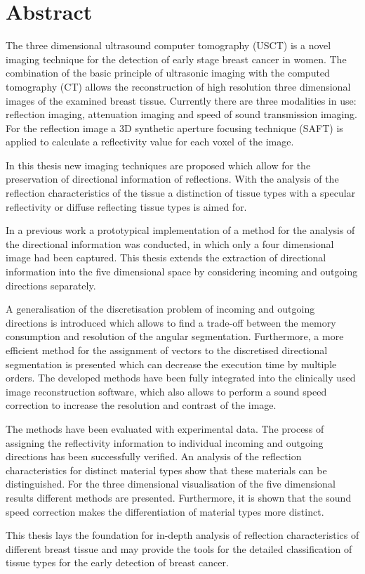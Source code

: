 \chapter*{Abstract}


The three dimensional ultrasound computer tomography (USCT) is a novel imaging technique for the detection of early stage breast cancer in women. The combination of the basic principle of ultrasonic imaging with the computed tomography (CT) allows the reconstruction of high resolution three dimensional images of the examined breast tissue. Currently there are three modalities in use: reflection imaging, attenuation imaging and speed of sound transmission imaging. For the reflection image a 3D synthetic aperture focusing technique (SAFT) is applied to calculate a reflectivity value for each voxel of the image.

In this thesis new imaging techniques are proposed which allow for the preservation of directional information of reflections. With the analysis of the reflection characteristics of the tissue a distinction of tissue types with a specular reflectivity or diffuse reflecting tissue types is aimed for. 


In a previous work a prototypical implementation of a method for the analysis of the directional information was conducted, in which only a four dimensional image had been captured. This thesis extends the extraction of directional information into the five dimensional space by considering incoming and outgoing directions separately.


A generalisation of the discretisation problem of incoming and outgoing directions is introduced which allows to find a trade-off between the memory consumption and resolution of the angular segmentation. Furthermore, a more efficient method for the assignment of vectors to the discretised directional segmentation is presented which can decrease the execution time by multiple orders. The developed methods have been fully integrated into the clinically used image reconstruction software, which also allows to perform a sound speed correction to increase the resolution and contrast of the image.

The methods have been evaluated with experimental data. The process of assigning the reflectivity information to individual incoming and outgoing directions has been successfully verified. An analysis of the reflection characteristics for distinct material types show that these materials can be distinguished. 
For the three dimensional visualisation of the five dimensional results different methods are presented. Furthermore, it is shown that the sound speed correction makes the differentiation of material types more distinct.

This thesis lays the foundation for in-depth analysis of reflection characteristics of different breast tissue and may provide the tools for the detailed classification of tissue types for the early detection of breast cancer.
